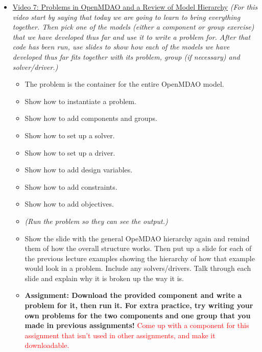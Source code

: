\documentclass[12pt, letterpaper]{article}
\begin{document}
\begin{itemize}
	\item \underline{Video 7: Problems in OpenMDAO and a Review of Model Hierarchy} \textit{(For this video start by saying that today we are going to 	learn to bring everything together. Then pick one of the models (either a component or group exercise) that we have developed thus far and use it to write a problem for. After that code has been run, use slides to show how each of the models we have developed thus far fits together with its 			problem, group (if necessary) and solver/driver.)}
		\begin{itemize}
			\item The problem is the container for the entire OpenMDAO model.
			\item Show how to instantiate a problem.
			\item Show how to add components and groups.
			\item Show how to set up a solver.
			\item Show how to set up a driver.
			\item Show how to add design variables.
			\item Show how to add constraints.
			\item Show how to add objectives.
			\item \textit{(Run the problem so they can see the output.)}
			\item Show the slide with the general OpeMDAO hierarchy again and remind them of how the overall structure works. Then put up a slide 					for each of the previous lecture examples showing the hierarchy of how that example would look in a problem. Include any solvers/drivers. Talk 					through each slide and explain why it is broken up the way it is.
			\item \textbf{Assignment: Download the provided component and write a problem for it, then run it. For extra practice, try writing your own problems for the two components and one group that you made in previous assignments!} \textcolor{red}{Come up with a component for this assignment that isn't used in other assignments, and make it downloadable.}
		\end{itemize}


\end{itemize}
\end{document}
